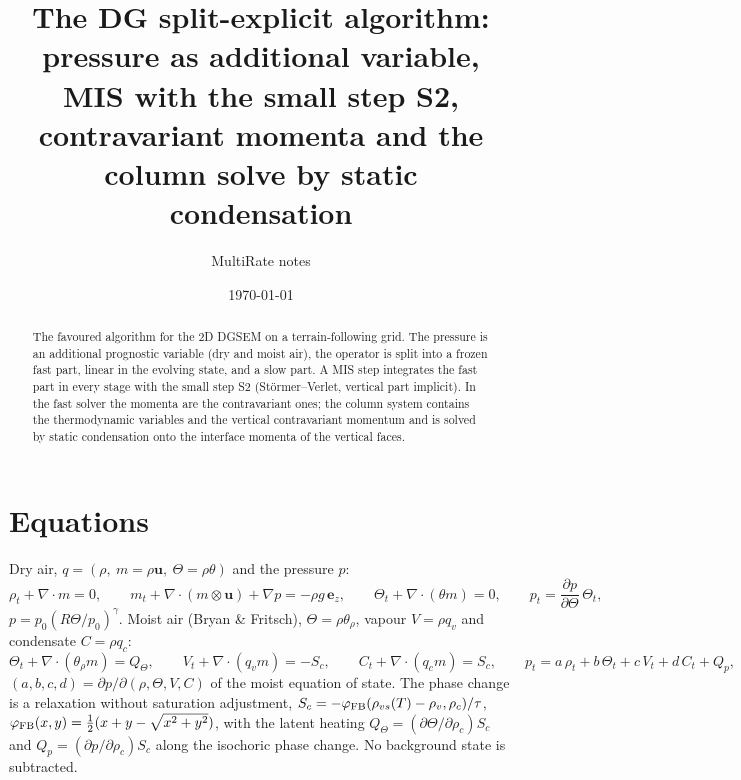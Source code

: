\documentclass[11pt,a4paper]{article}
\title{The DG split-explicit algorithm:\\pressure as additional variable, MIS with the small step S2,\\contravariant momenta and the column solve by static condensation}
\author{MultiRate notes}
\date{\today}
\begin{document}
\maketitle

\begin{abstract}
The favoured algorithm for the 2D DGSEM on a terrain-following grid. The pressure is an additional prognostic variable (dry
and moist air), the operator is split into a frozen fast part, linear in the evolving state, and a slow part. A MIS step
integrates the fast part in every stage with the small step S2 (Störmer--Verlet, vertical part implicit). In the fast solver the
momenta are the contravariant ones; the column system contains the thermodynamic variables and the vertical contravariant
momentum and is solved by static condensation onto the interface momenta of the vertical faces.
\end{abstract}

\section{Equations}
Dry air, $q=(\rho,\ m=\rho\mathbf u,\ \Theta=\rho\theta)$ and the pressure $p$:
\[
\rho_t+\nabla\cdot m=0,\qquad m_t+\nabla\cdot(m\otimes\mathbf u)+\nabla p=-\rho g\,\mathbf e_z,\qquad \Theta_t+\nabla\cdot(\theta m)=0,\qquad
p_t=\frac{\partial p}{\partial\Theta}\,\Theta_t ,
\]
$p=p_0(R\Theta/p_0)^\gamma$. Moist air (Bryan \& Fritsch), $\Theta=\rho\theta_\rho$, vapour $V=\rho q_v$ and condensate $C=\rho q_c$:
\[
\Theta_t+\nabla\cdot(\theta_\rho m)=Q_\Theta,\qquad V_t+\nabla\cdot(q_vm)=-S_c,\qquad C_t+\nabla\cdot(q_cm)=S_c,\qquad
p_t=a\,\rho_t+b\,\Theta_t+c\,V_t+d\,C_t+Q_p,
\]
$(a,b,c,d)=\partial p/\partial(\rho,\Theta,V,C)$ of the moist equation of state. The phase change is a relaxation without saturation adjustment,
$S_c=-\varphi_{\rm FB}(\rho_{vs}(T)-\rho_v,\rho_c)/\tau$, $\varphi_{\rm FB}(x,y)=\tfrac12(x+y-\sqrt{x^2+y^2})$, with the latent heating
$Q_\Theta=(\partial\Theta/\partial\rho_c)S_c$ and $Q_p=(\partial p/\partial\rho_c)S_c$ along the isochoric phase change. No background state is subtracted.
\end{document}
